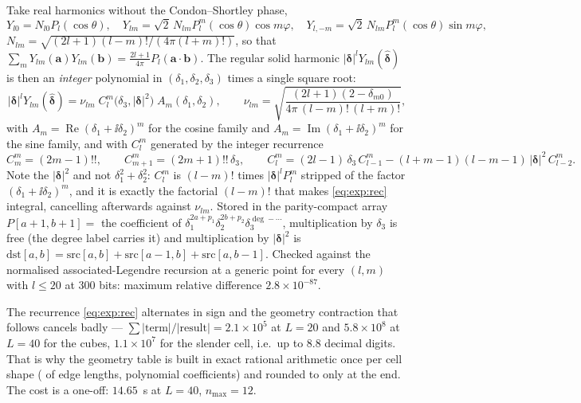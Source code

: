 Take real harmonics without the Condon--Shortley phase,
\begin{equation}
Y_{l0} = N_{l0}P_l(\cos\theta),\quad
Y_{lm} = \sqrt2\,N_{lm}P_l^m(\cos\theta)\cos m\varphi,\quad
Y_{l,-m} = \sqrt2\,N_{lm}P_l^m(\cos\theta)\sin m\varphi,
\label{eq:exp:Y}
\end{equation}
$N_{lm} = \sqrt{(2l+1)(l-m)!/(4\pi(l+m)!)}$, so that $\sum_m Y_{lm}(\mathbf{a})
Y_{lm}(\mathbf{b}) = \frac{2l+1}{4\pi}P_l(\mathbf{a}\cdot\mathbf{b})$. The regular solid
harmonic $|\boldsymbol{\delta}|^l Y_{lm}(\hat{\boldsymbol{\delta}})$ is then an
\emph{integer} polynomial in $(\delta_1,\delta_2,\delta_3)$ times a single square root:
\begin{equation}
|\boldsymbol{\delta}|^{l}Y_{lm}(\hat{\boldsymbol{\delta}})
= \nu_{lm}\;C_l^m\bigl(\delta_3, |\boldsymbol{\delta}|^2\bigr)\;A_m(\delta_1,\delta_2),
\qquad
\nu_{lm} = \sqrt{\frac{(2l+1)(2-\delta_{m0})}{4\pi\,(l-m)!\,(l+m)!}},
\label{eq:exp:solid}
\end{equation}
with $A_m = \operatorname{Re}(\delta_1+\ii\delta_2)^{m}$ for the cosine family and
$A_m = \operatorname{Im}(\delta_1+\ii\delta_2)^{m}$ for the sine family, and with
$C_l^m$ generated by the integer recurrence
\begin{equation}
C_m^m = (2m-1)!!,\qquad C_{m+1}^m = (2m+1)!!\,\delta_3,\qquad
C_l^m = (2l-1)\,\delta_3\,C_{l-1}^m - (l+m-1)(l-m-1)\,|\boldsymbol{\delta}|^2\,C_{l-2}^m .
\label{eq:exp:rec}
\end{equation}
Note the $|\boldsymbol{\delta}|^2$ and not $\delta_1^2+\delta_2^2$: $C_l^m$ is
$(l-m)!$ times $|\boldsymbol{\delta}|^l P_l^m$ stripped of the factor
$(\delta_1+\ii\delta_2)^m$, and it is exactly the factorial $(l-m)!$ that makes
\eqref{eq:exp:rec} integral, cancelling afterwards against $\nu_{lm}$. Stored in the
parity-compact array $P[a+1,b+1] = $ the coefficient of
$\delta_1^{2a+p_1}\delta_2^{2b+p_2}\delta_3^{\deg-\cdots}$, multiplication by $\delta_3$
is free (the degree label carries it) and multiplication by $|\boldsymbol{\delta}|^2$ is
$\mathrm{dst}[a,b] = \mathrm{src}[a,b]+\mathrm{src}[a-1,b]+\mathrm{src}[a,b-1]$. Checked
against the normalised associated-Legendre recursion at a generic point for every $(l,m)$
with $l \le 20$ at $300$ bits: maximum relative difference $2.8\times10^{-87}$.

The recurrence \eqref{eq:exp:rec} alternates in sign and the geometry contraction that
follows cancels badly --- $\sum|\text{term}|/|\text{result}| = 2.1\times10^{5}$ at
$L = 20$ and $5.8\times10^{8}$ at $L = 40$ for the cubes, $1.1\times10^{7}$ for the
slender cell, i.e.\ up to $8.8$ decimal digits. That is why the geometry table is built in
exact rational arithmetic once per cell shape ( of  edge lengths,
 polynomial coefficients) and rounded to  only at the end. The
cost is a one-off: $14.65$~s at $L = 40$, $n_{\max} = 12$.

